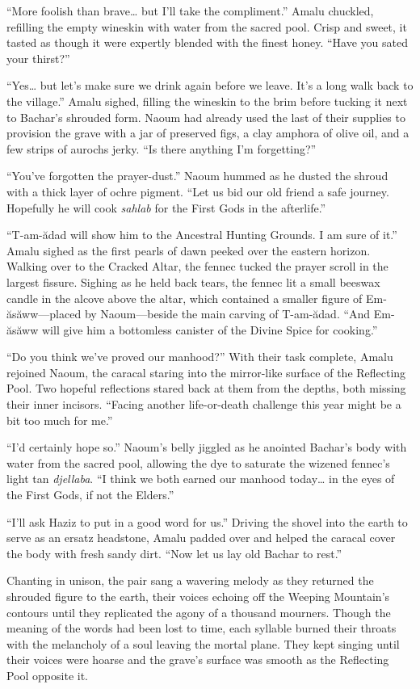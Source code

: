 ``More foolish than brave\ldots{} but I'll take the compliment.'' Amalu chuckled, refilling the empty wineskin with water from the sacred pool. Crisp and sweet, it tasted as though it were expertly blended with the finest honey. ``Have you sated your thirst?''

``Yes\ldots{} but let's make sure we drink again before we leave. It's a long walk back to the village.'' Amalu sighed, filling the wineskin to the brim before tucking it next to Bachar's shrouded form. Naoum had already used the last of their supplies to provision the grave with a jar of preserved figs, a clay amphora of olive oil, and a few strips of aurochs jerky. ``Is there anything I'm forgetting?''

``You've forgotten the prayer-dust.'' Naoum hummed as he dusted the shroud with a thick layer of ochre pigment. ``Let us bid our old friend a safe journey. Hopefully he will cook \emph{sahlab} for the First Gods in the afterlife.''

``T-am-ădad will show him to the Ancestral Hunting Grounds. I am sure of it.'' Amalu sighed as the first pearls of dawn peeked over the eastern horizon. Walking over to the Cracked Altar, the fennec tucked the prayer scroll in the largest fissure. Sighing as he held back tears, the fennec lit a small beeswax candle in the alcove above the altar, which contained a smaller figure of Em-ăsăww---placed by Naoum---beside the main carving of T-am-ădad. ``And Em-ăsăww will give him a bottomless canister of the Divine Spice for cooking.''

``Do you think we've proved our manhood?'' With their task complete, Amalu rejoined Naoum, the caracal staring into the mirror-like surface of the Reflecting Pool. Two hopeful reflections stared back at them from the depths, both missing their inner incisors. ``Facing another life-or-death challenge this year might be a bit too much for me.''

``I'd certainly hope so.'' Naoum's belly jiggled as he anointed Bachar's body with water from the sacred pool, allowing the dye to saturate the wizened fennec's light tan \emph{djellaba}. ``I think we both earned our manhood today\ldots{} in the eyes of the First Gods, if not the Elders.''

``I'll ask Haziz to put in a good word for us.'' Driving the shovel into the earth to serve as an ersatz headstone, Amalu padded over and helped the caracal cover the body with fresh sandy dirt. ``Now let us lay old Bachar to rest.''

Chanting in unison, the pair sang a wavering melody as they returned the shrouded figure to the earth, their voices echoing off the Weeping Mountain's contours until they replicated the agony of a thousand mourners. Though the meaning of the words had been lost to time, each syllable burned their throats with the melancholy of a soul leaving the mortal plane. They kept singing until their voices were hoarse and the grave's surface was smooth as the Reflecting Pool opposite it.

